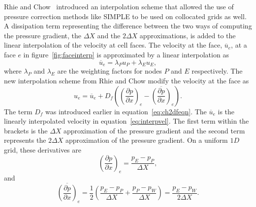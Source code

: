 Rhie and Chow~\cite{Rhie1983} introduced an interpolation scheme that allowed the use of pressure correction methods like SIMPLE to be used on collocated grids as well. A dissipation term representing the difference between the two ways of computing the pressure gradient, the $\Delta X$ and the $2\Delta X$ approximations,  is added to the linear interpolation of the velocity at cell faces. 
The velocity at the face, $\overline{u}_e$, at a face $e$ in figure~\ref{fig:faceinterp} is approximated by a linear interpolation as
\begin{equation}
\overline{u}_e = \lambda_P u_P + \lambda_E u_E,
\label{eq:interpvel}
\end{equation}
where $\lambda_P$ and $\lambda_E$ are the weighting factors for nodes $P$ and $E$ respectively. The new interpolation scheme from Rhie and Chow modify the velocity 
at the face as
\begin{equation}
u_e = \overline{u}_e + D_f\left( \left(\frac{\partial p}{\partial x}\right)_e - \overline{\left(\frac{\partial p}{\partial x}\right)}_e \right).
\label{eq:RCorig}
\end{equation}
The term $D_f$ was introduced earlier in equation~\ref{eq:ch2dfeqn}. The $\overline{u}_e$ is the linearly interpolated velocity in equation~\ref{eq:interpvel}. The first term within the brackets is the $\Delta X$ approximation of the pressure gradient and the second term represents the $2\Delta X$ approximation of the pressure gradient. On a uniform $1D$ grid, these derivatives are
\begin{equation}
\left(\frac{\partial p}{\partial x}\right)_e = \frac{p_E - p_P}{\Delta X},
\end{equation}
and
\begin{equation}
\overline{\left(\frac{\partial p}{\partial x}\right)}_e = \frac{1}{2}\left(\frac{p_E - p_P}{\Delta X} + \frac{p_P - p_W}{\Delta X} \right)= \frac{p_E - p_W}{2\Delta X}.
\end{equation}

